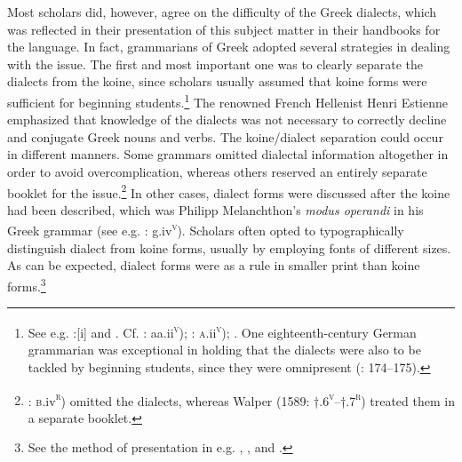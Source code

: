 Most scholars did, however, agree on the difficulty of the Greek dialects, which was reflected in their presentation of this subject matter in their handbooks for the language. In fact, grammarians of Greek adopted several strategies in dealing with the issue. The first and most important one was to clearly separate the dialects from the koine, since scholars usually assumed that koine forms were sufficient for beginning students.\footnote{See e.g. \citet{Da1501}:[i] and \citet[223]{Tavoni1986}. Cf. \citet{Glarean1524}: aa.ii\textsc{\textsuperscript{v}}); \citet{Metzler1529}: \textsc{a}.ii\textsc{\textsuperscript{v}}); \citet[105]{Rollin1726}. One eighteenth-century German grammarian was exceptional in holding that the dialects were also to be tackled by beginning students, since they were omnipresent (\citealt{Trendelenburg1782}: 174–175).} The renowned French Hellenist Henri Estienne emphasized that knowledge of the dialects was not necessary to correctly decline and conjugate Greek nouns and verbs. The koine/dialect separation could occur in different manners. Some grammars omitted dialectal information altogether in order to avoid overcomplication, whereas others reserved an entirely separate booklet for the issue.\footnote{\citet[]{Caselius1560}: \textsc{b.}iv\textsc{\textsuperscript{r}}) omitted the dialects, whereas Walper (1589: †.6\textsc{\textsuperscript{v}}–†.7\textsc{\textsuperscript{r}}) treated them in a separate booklet.} In other cases, dialect forms were discussed after the koine had been described, which was Philipp Melanchthon’s \textit{modus operandi} in his Greek grammar (see e.g. \citealt{Melanchthon1518}: g.iv\textsc{\textsuperscript{v}}). Scholars often opted to typographically distinguish dialect from koine forms, usually by employing fonts of different sizes. As can be expected, dialect forms were as a rule in smaller print than koine forms.\footnote{See the method of presentation in e.g. \citet{Gretser1593}, \citet{Anon.1613}, and \citet{Lancelot1655}.}

